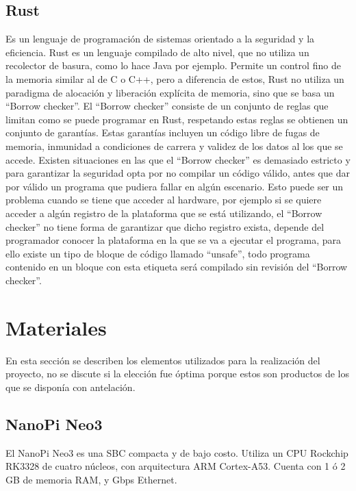 \documentclass[12pt,letterpaper]{article}     %
\begin{document}
\subsection{Rust}

Es un lenguaje de programación de sistemas orientado a la seguridad y la eficiencia. 
Rust es un lenguaje compilado de alto nivel, que no utiliza un recolector de basura, 
como lo hace Java por ejemplo. Permite un control fino de la memoria similar al de 
C o C++, pero a diferencia de estos, Rust no utiliza un paradigma de alocación y 
liberación explícita de memoria, sino que se basa un ``Borrow checker''.
El ``Borrow checker'' consiste de un conjunto de reglas que limitan como se puede 
programar en Rust, respetando estas reglas se obtienen un conjunto de garantías.
Estas garantías incluyen un código libre de fugas de memoria, inmunidad a condiciones 
de carrera y validez de los datos al los que se accede. 
Existen situaciones en las que el ``Borrow checker'' es demasiado estricto y para
garantizar la seguridad opta por no compilar un código válido, antes que dar por válido
un programa que pudiera fallar en algún escenario. Esto puede ser un problema cuando 
se tiene que acceder al hardware, por ejemplo si se quiere acceder a algún registro 
de la plataforma que se está utilizando, el ``Borrow checker'' no tiene forma de garantizar
que dicho registro exista, depende del programador conocer la plataforma en la que se va a 
ejecutar el programa, para ello existe un tipo de bloque de código llamado ``unsafe'', todo
programa contenido en un bloque con esta etiqueta será compilado sin revisión del ``Borrow checker''.

\clearpage
\section{Materiales}

En esta sección se describen los elementos utilizados para la realización del proyecto, no se discute si la
elección fue óptima porque estos son productos de los que se disponía con antelación.

\subsection{NanoPi Neo3}

El NanoPi Neo3 es una SBC compacta y de bajo costo. Utiliza un CPU Rockchip RK3328 de cuatro núcleos, con
arquitectura ARM Cortex-A53. Cuenta con 1 ó 2 GB de memoria RAM, y Gbps Ethernet. 
\end{document}
